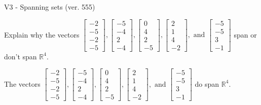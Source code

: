 \begin{exercise}
  \begin{exerciseTitle}V3 - Spanning sets (ver. 555)\end{exerciseTitle}
  \begin{exerciseStatement}
    Explain why the vectors \(\left[\begin{array}{r}
-2 \\
-5 \\
-2 \\
-5
\end{array}\right] , \left[\begin{array}{r}
-5 \\
-4 \\
2 \\
-4
\end{array}\right] , \left[\begin{array}{r}
0 \\
4 \\
2 \\
-5
\end{array}\right] , \left[\begin{array}{r}
2 \\
1 \\
4 \\
-2
\end{array}\right] , \text{ and } \left[\begin{array}{r}
-5 \\
-5 \\
3 \\
-1
\end{array}\right]\) span or don't span \(\mathbb{R}^4\). 
	


  \end{exerciseStatement}
  \begin{exerciseAnswer}
   The vectors \(\left[\begin{array}{r}
-2 \\
-5 \\
-2 \\
-5
\end{array}\right] , \left[\begin{array}{r}
-5 \\
-4 \\
2 \\
-4
\end{array}\right] , \left[\begin{array}{r}
0 \\
4 \\
2 \\
-5
\end{array}\right] , \left[\begin{array}{r}
2 \\
1 \\
4 \\
-2
\end{array}\right] , \text{ and } \left[\begin{array}{r}
-5 \\
-5 \\
3 \\
-1
\end{array}\right]\) 
  	 do  
	span \(\mathbb{R}^4\).
  



\end{exerciseAnswer}
\end{exercise}
